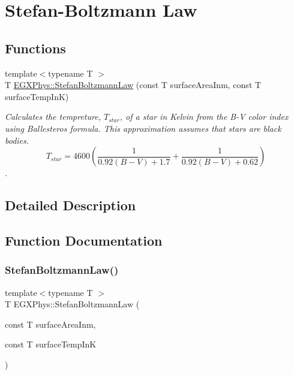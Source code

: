 \hypertarget{group___e_g_x_phys-_electrodynamics-_black_body-_stefan_boltzmann_law}{}\section{Stefan-\/\+Boltzmann Law}
\label{group___e_g_x_phys-_electrodynamics-_black_body-_stefan_boltzmann_law}
\subsection*{Functions}
\begin{DoxyCompactItemize}
\item 
{\footnotesize template$<$typename T $>$ }\\T \mbox{\hyperlink{group___e_g_x_phys-_electrodynamics-_black_body-_stefan_boltzmann_law_ga1672439c53b17cdad6cf7b30b94c53d4}{E\+G\+X\+Phys\+::\+Stefan\+Boltzmann\+Law}} (const T surface\+Area\+Inm, const T surface\+Temp\+InK)
\begin{DoxyCompactList}\small\item\em Calculates the tempreture, $T_{star}$, of a star in Kelvin from the B-\/V color index using Ballesteros\textquotesingle{} formula. This approximation assumes that stars are black bodies. \[T_{star}=4600 \left ( \frac{1}{0.92 (B-V)+ 1.7} + \frac{1}{0.92 (B-V) + 0.62} \right )\]. \end{DoxyCompactList}\end{DoxyCompactItemize}


\subsection{Detailed Description}


\subsection{Function Documentation}
\mbox{\label{group___e_g_x_phys-_electrodynamics-_black_body-_stefan_boltzmann_law_ga1672439c53b17cdad6cf7b30b94c53d4}} 
\subsubsection{\texorpdfstring{Stefan\+Boltzmann\+Law()}{StefanBoltzmannLaw()}}
{\footnotesize\ttfamily template$<$typename T $>$ \\
T E\+G\+X\+Phys\+::\+Stefan\+Boltzmann\+Law (\begin{DoxyParamCaption}\item[{const T}]{surface\+Area\+Inm,  }\item[{const T}]{surface\+Temp\+InK }\end{DoxyParamCaption})}



